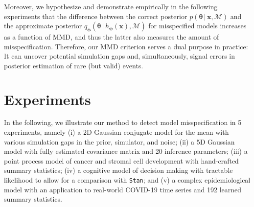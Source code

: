 \documentclass[twoside,11pt]{article}
\newcommand{\x}{\boldsymbol{x}}
\newcommand{\thetab}{\boldsymbol{\theta}}
\newcommand{\phib}{\boldsymbol{\phi}}
\newcommand{\psib}{\boldsymbol{\psi}}
\newcommand{\0}{\boldsymbol{0}}
\newcommand{\given}{\,|\,}
\begin{document}
Moreover, we hypothesize and demonstrate empirically in the following experiments that the difference between the correct posterior $p(\thetab \given \x, \mathcal{M})$ and the approximate posterior $q_{\phib}(\thetab \given h_{\psib}(\x), \mathcal{M})$ for misspecified models increases as a function of MMD, and thus the latter also measures the amount of misspecification.
Therefore, our MMD criterion serves a dual purpose in practice: It can uncover potential simulation gaps and, simultaneously, signal errors in posterior estimation of rare (but valid) events.

\section{Experiments}
In the following, we illustrate our method to detect model misspecification in 5 experiments, namely (i) a 2D Gaussian conjugate model for the mean with various simulation gaps in the prior, simulator, and noise; (ii) a 5D Gaussian model with fully estimated covariance matrix and 20 inference parameters; (iii) a point process model of cancer and stromal cell development with hand-crafted summary statistics; (iv) a cognitive model of decision making with tractable likelihood to allow for a comparison with \texttt{Stan}; and (v) a complex epidemiological model with an application to real-world COVID-19 time series and 192 learned summary statistics.
\end{document}
